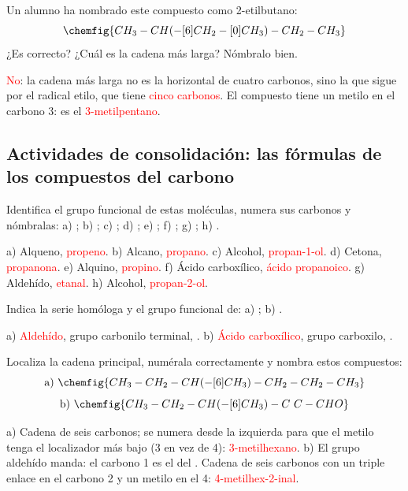 \begin{exercise}
    Un alumno ha nombrado este compuesto como 2-etilbutano:
    \[ \chemfig{CH_3-CH(-[6]CH_2-[0]CH_3)-CH_2-CH_3} \]
    ¿Es correcto? ¿Cuál es la cadena más larga? Nómbralo bien.
    \begin{solu}
        \textcolor{red}{No}: la cadena más larga no es la horizontal de cuatro carbonos, sino la que sigue por el radical etilo, que tiene \textcolor{red}{cinco carbonos}. El compuesto tiene un metilo en el carbono 3: es el \textcolor{red}{3-metilpentano}.
    \end{solu}
\end{exercise}

\subsection*{Actividades de consolidación: las fórmulas de los compuestos del carbono}

\begin{exercise}
    Identifica el grupo funcional de estas moléculas, numera sus carbonos y nómbralas: a) ; b) ; c) ; d) ; e) ; f) ; g) ; h) .
    \begin{solu}
        a) Alqueno, \textcolor{red}{propeno}. b) Alcano, \textcolor{red}{propano}. c) Alcohol, \textcolor{red}{propan-1-ol}. d) Cetona, \textcolor{red}{propanona}. e) Alquino, \textcolor{red}{propino}. f) Ácido carboxílico, \textcolor{red}{ácido propanoico}. g) Aldehído, \textcolor{red}{etanal}. h) Alcohol, \textcolor{red}{propan-2-ol}.
    \end{solu}
\end{exercise}

\begin{exercise}
    Indica la serie homóloga y el grupo funcional de: a) ; b) .
    \begin{solu}
        a) \textcolor{red}{Aldehído}, grupo carbonilo terminal, . b) \textcolor{red}{Ácido carboxílico}, grupo carboxilo, .
    \end{solu}
\end{exercise}

\begin{exercise}
    Localiza la cadena principal, numérala correctamente y nombra estos compuestos:
    \[ \text{a)}\ \chemfig{CH_3-CH_2-CH(-[6]CH_3)-CH_2-CH_2-CH_3} \]
    \[ \text{b)}\ \chemfig{CH_3-CH_2-CH(-[6]CH_3)-C~C-CHO} \]
    \begin{solu}
        a) Cadena de seis carbonos; se numera desde la izquierda para que el metilo tenga el localizador más bajo (3 en vez de 4): \textcolor{red}{3-metilhexano}.
        b) El grupo aldehído manda: el carbono 1 es el del . Cadena de seis carbonos con un triple enlace en el carbono 2 y un metilo en el 4: \textcolor{red}{4-metilhex-2-inal}.
    \end{solu}
\end{exercise}

